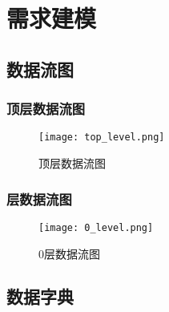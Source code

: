 \chapter{需求建模 }
\begin{landscape}
    \section{数据流图}
    
        \subsection{顶层数据流图}
    
        \begin{figure}[ht]
            \centering
            \texttt{[image: top\_level.png]}\label{tab:classification}
            \caption{顶层数据流图}\label{fig:noted-figure}
        \end{figure}
    \end{landscape}
        \newpage
    \begin{landscape}
        \subsection{层数据流图}
        \begin{figure}[ht]
            \centering
            \texttt{[image: 0\_level.png]}\label{tab:classification}
            \caption{0层数据流图}\label{fig:noted-figure}
        \end{figure}
    \end{landscape}
        \newpage
    \section{数据字典}

